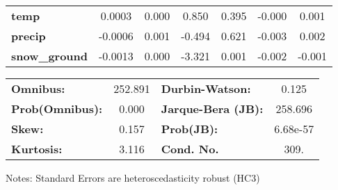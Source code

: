 \begin{center}
\begin{tabular}{lcccccc}
\textbf{temp}          &       0.0003  &        0.000     &     0.850  &         0.395        &       -0.000    &        0.001     \\
\textbf{precip}        &      -0.0006  &        0.001     &    -0.494  &         0.621        &       -0.003    &        0.002     \\
\textbf{snow\_ground}  &      -0.0013  &        0.000     &    -3.321  &         0.001        &       -0.002    &       -0.001     \\
\bottomrule
\end{tabular}
\begin{tabular}{lclc}
\textbf{Omnibus:}       & 252.891 & \textbf{  Durbin-Watson:     } &    0.125  \\
\textbf{Prob(Omnibus):} &   0.000 & \textbf{  Jarque-Bera (JB):  } &  258.696  \\
\textbf{Skew:}          &   0.157 & \textbf{  Prob(JB):          } & 6.68e-57  \\
\textbf{Kurtosis:}      &   3.116 & \textbf{  Cond. No.          } &     309.  \\
\bottomrule
\end{tabular}
\end{center}

Notes: \newline
 [1] Standard Errors are heteroscedasticity robust (HC3)